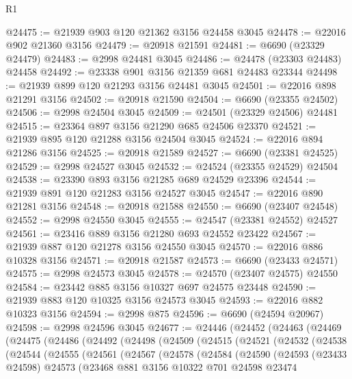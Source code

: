 \begin{lexlean}{R1}
\begin{coremodule}
@24475 := @21939 @903 @120 @21362 @3156 @24458 @3045
@24478 := @22016 @902 @21360 @3156
@24479 := @20918 @21591
@24481 := @6690 (@23329 @24479)
@24483 := @2998 @24481 @3045
@24486 := @24478 (@23303 @24483) @24458
@24492 := @23338 @901 @3156 @21359 @681 @24483 @23344
@24498 := @21939 @899 @120 @21293 @3156 @24481 @3045
@24501 := @22016 @898 @21291 @3156
@24502 := @20918 @21590
@24504 := @6690 (@23355 @24502)
@24506 := @2998 @24504 @3045
@24509 := @24501 (@23329 @24506) @24481
@24515 := @23364 @897 @3156 @21290 @685 @24506 @23370
@24521 := @21939 @895 @120 @21288 @3156 @24504 @3045
@24524 := @22016 @894 @21286 @3156
@24525 := @20918 @21589
@24527 := @6690 (@23381 @24525)
@24529 := @2998 @24527 @3045
@24532 := @24524 (@23355 @24529) @24504
@24538 := @23390 @893 @3156 @21285 @689 @24529 @23396
@24544 := @21939 @891 @120 @21283 @3156 @24527 @3045
@24547 := @22016 @890 @21281 @3156
@24548 := @20918 @21588
@24550 := @6690 (@23407 @24548)
@24552 := @2998 @24550 @3045
@24555 := @24547 (@23381 @24552) @24527
@24561 := @23416 @889 @3156 @21280 @693 @24552 @23422
@24567 := @21939 @887 @120 @21278 @3156 @24550 @3045
@24570 := @22016 @886 @10328 @3156
@24571 := @20918 @21587
@24573 := @6690 (@23433 @24571)
@24575 := @2998 @24573 @3045
@24578 := @24570 (@23407 @24575) @24550
@24584 := @23442 @885 @3156 @10327 @697 @24575 @23448
@24590 := @21939 @883 @120 @10325 @3156 @24573 @3045
@24593 := @22016 @882 @10323 @3156
@24594 := @2998 @875
@24596 := @6690 (@24594 @20967)
@24598 := @2998 @24596 @3045
@24677 := @24446
    (@24452
      (@24463
        (@24469
          (@24475
            (@24486
              (@24492
                (@24498
                  (@24509
                    (@24515
                      (@24521
                        (@24532
                          (@24538
                            (@24544
                              (@24555
                                (@24561
                                  (@24567
                                    (@24578
                                      (@24584
                                        (@24590
                                          (@24593
                                            (@23433 @24598)
                                            @24573
                                            (@23468
                                              @881
                                              @3156
                                              @10322
                                              @701
                                              @24598
                                              @23474

\end{coremodule}
\end{lexlean}
